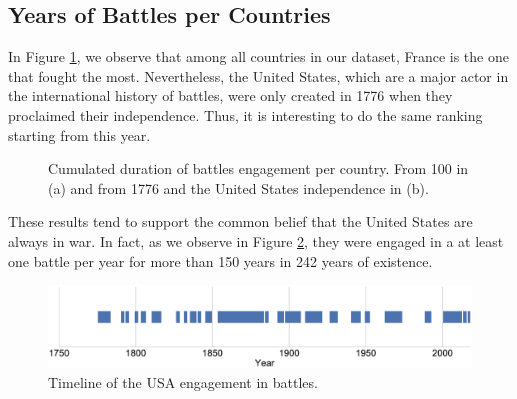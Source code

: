 \subsection{Years of Battles per Countries}
In Figure \ref{fig:FightingDurationRanking}, we observe that among all countries in our dataset, France is the one that fought the most. Nevertheless, the United States, which are a major actor in the international history of battles, were only created in 1776 when they proclaimed their independence. Thus, it is interesting to do the same ranking starting from this year. 
 \begin{figure}[h]
	\hspace{-0.4 em}
	\vspace{-0.1 em}
	\caption{Cumulated duration of battles engagement per country. From 100 in (a) and from 1776 and the United States independence in (b).} 
	\label{fig:FightingDurationRanking}
\end{figure}
 These results tend to support the common belief that the United States are always in war. In fact, as we observe in Figure \ref{fig:USAFightingTimeline}, they were engaged in a at least one battle per year for more than 150 years in 242 years of existence.
 \begin{figure}[h]
 	\centering	\includegraphics[width=\linewidth]{figures/USAFighting}
 	\caption{Timeline of the USA engagement in battles.}\label{fig:USAFightingTimeline}
 	\centering
 \end{figure}

